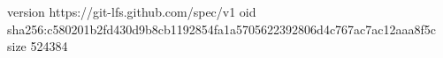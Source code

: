 version https://git-lfs.github.com/spec/v1
oid sha256:c580201b2fd430d9b8cb1192854fa1a5705622392806d4c767ac7ac12aaa8f5c
size 524384
